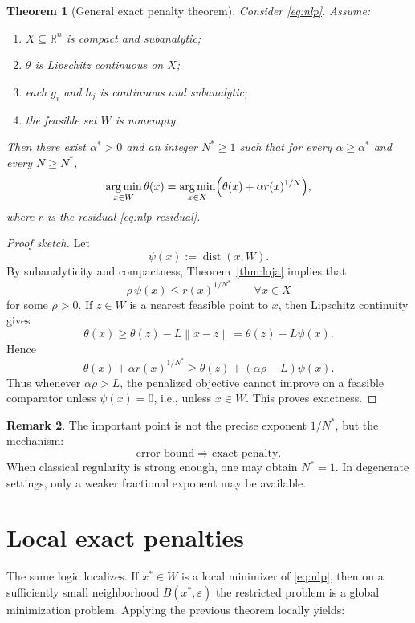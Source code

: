\documentclass[pdflatex,sn-mathphys-num]{sn-jnl}%
\newtheorem{theorem}{Theorem}[section]
\theoremstyle{definition}
\newtheorem{remark}[theorem]{Remark}
\newcommand{\R}{\mathbb{R}}
\newcommand{\argmin}{\operatorname*{arg\,min}}
\newcommand{\dist}{\operatorname{dist}}
\newcommand{\norm}[1]{\left\lVert #1 \right\rVert}
\begin{document}
\begin{theorem}[General exact penalty theorem]
\label{thm:general-exact}
Consider \eqref{eq:nlp}. Assume:
\begin{enumerate}[label=(\roman*)]
    \item $X\subseteq \R^n$ is compact and subanalytic;
    \item $\theta$ is Lipschitz continuous on $X$;
    \item each $g_i$ and $h_j$ is continuous and subanalytic;
    \item the feasible set $W$ is nonempty.
\end{enumerate}
Then there exist $\alpha^\ast>0$ and an integer $N^\ast\ge 1$ such that for every $\alpha\ge \alpha^\ast$ and every $N\ge N^\ast$,
\[
\argmin_{x\in W}\theta(x)
=
\argmin_{x\in X}\Bigl(\theta(x)+\alpha r(x)^{1/N}\Bigr),
\]
where $r$ is the residual \eqref{eq:nlp-residual}.
\end{theorem}

\begin{proof}[Proof sketch]
Let
\[
\psi(x):=\dist(x,W).
\]
By subanalyticity and compactness, Theorem~\ref{thm:loja} implies that
\[
\rho\,\psi(x)\le r(x)^{1/N^\ast}\qquad \forall x\in X
\]
for some $\rho>0$. If $z\in W$ is a nearest feasible point to $x$, then Lipschitz continuity gives
\[
\theta(x)\ge \theta(z)-L\norm{x-z}=\theta(z)-L\psi(x).
\]
Hence
\[
\theta(x)+\alpha r(x)^{1/N^\ast}
\ge
\theta(z)+(\alpha\rho-L)\psi(x).
\]
Thus whenever $\alpha\rho>L$, the penalized objective cannot improve on a feasible comparator unless $\psi(x)=0$, i.e., unless $x\in W$. This proves exactness.
\end{proof}

\begin{remark}
The important point is not the precise exponent $1/N^\ast$, but the mechanism:
\[
\text{error bound} \Longrightarrow \text{exact penalty}.
\]
When classical regularity is strong enough, one may obtain $N^\ast=1$. In degenerate settings, only a weaker fractional exponent may be available.
\end{remark}

\section{Local exact penalties}

The same logic localizes. If $x^\ast\in W$ is a local minimizer of \eqref{eq:nlp}, then on a sufficiently small neighborhood $B(x^\ast,\varepsilon)$ the restricted problem is a global minimization problem. Applying the previous theorem locally yields:
\end{document}
